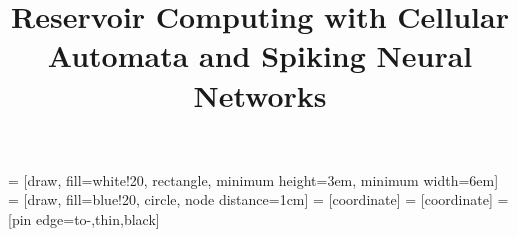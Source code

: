 \documentclass[conference]{IEEEtran}
\begin{document}
 = [draw, fill=white!20, rectangle, 
    minimum height=3em, minimum width=6em]
 = [draw, fill=blue!20, circle, node distance=1cm]
 = [coordinate]
 = [coordinate]
 = [pin edge={to-,thin,black}]

\title{Reservoir Computing with Cellular Automata and Spiking Neural Networks}

\author{

}

\maketitle

\begin{abstract}
  \lipsum[1]
\end{abstract}










\end{document}
